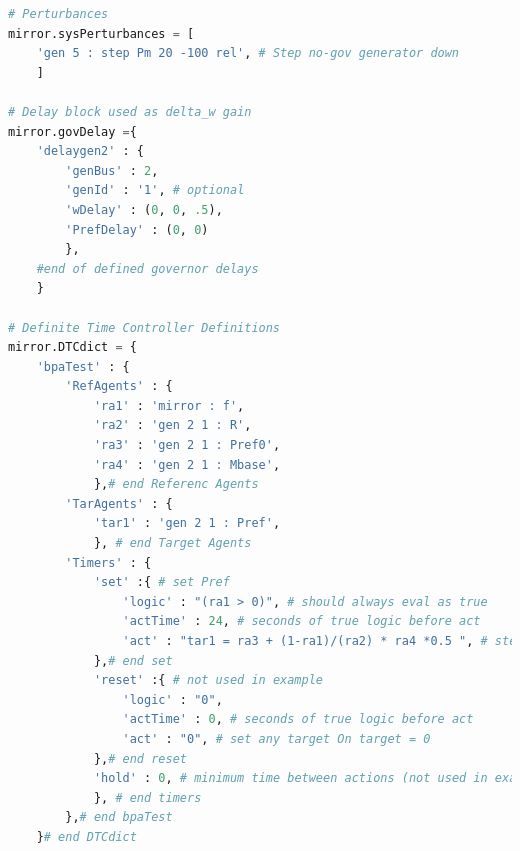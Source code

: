 \documentclass[12pt]{article}
\begin{document}
\vspace{1em}

\begin{lstlisting}[language=Python]
# Perturbances
mirror.sysPerturbances = [
    'gen 5 : step Pm 20 -100 rel', # Step no-gov generator down
    ]

# Delay block used as delta_w gain
mirror.govDelay ={
    'delaygen2' : {
        'genBus' : 2,
        'genId' : '1', # optional
        'wDelay' : (0, 0, .5),
        'PrefDelay' : (0, 0)
        },
    #end of defined governor delays
    }

# Definite Time Controller Definitions
mirror.DTCdict = {
    'bpaTest' : {
        'RefAgents' : {
            'ra1' : 'mirror : f',
            'ra2' : 'gen 2 1 : R', 
            'ra3' : 'gen 2 1 : Pref0',
            'ra4' : 'gen 2 1 : Mbase',
            },# end Referenc Agents
        'TarAgents' : {
            'tar1' : 'gen 2 1 : Pref',
            }, # end Target Agents
        'Timers' : {
            'set' :{ # set Pref
                'logic' : "(ra1 > 0)", # should always eval as true
                'actTime' : 24, # seconds of true logic before act
                'act' : "tar1 = ra3 + (1-ra1)/(ra2) * ra4 *0.5 ", # step Pref 
            },# end set
            'reset' :{ # not used in example
                'logic' : "0",
                'actTime' : 0, # seconds of true logic before act
                'act' : "0", # set any target On target = 0
            },# end reset
            'hold' : 0, # minimum time between actions (not used in example)
            }, # end timers
        },# end bpaTest
    }# end DTCdict

\end{lstlisting}
\end{document}
